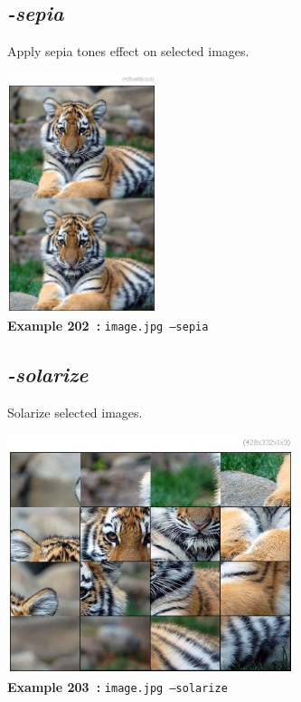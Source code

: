 \documentclass[a4paper,11pt,twoside]{book}
\begin{document}
\subsection{\emph{-sepia} }\vspace*{-0.5em}
Apply sepia tones effect on selected images.
\begin{center}\includegraphics[keepaspectratio=true,height=7cm,width=\textwidth]{img/gmic_def202.jpg}\\
{\footnotesize \textbf{Example 202~:} \texttt{image.jpg --sepia}}
\end{center}

\subsection{\emph{-solarize} }\vspace*{-0.5em}
Solarize selected images.
\begin{center}\includegraphics[keepaspectratio=true,height=7cm,width=\textwidth]{img/gmic_def203.jpg}\\
{\footnotesize \textbf{Example 203~:} \texttt{image.jpg --solarize}}
\end{center}
\end{document}
